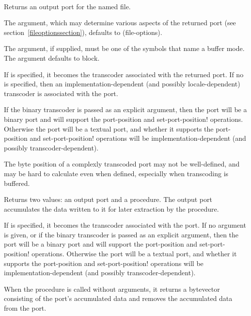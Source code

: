 \begin{entry}{%
\\
}

Returns an output port for the named file.

The  argument, which may determine
various aspects of the returned port (see section~\ref{fileoptionssection}),
defaults to {\cf (file-options)}.

The  argument, if supplied,
must be one of the symbols that name a buffer mode.
The  argument defaults to {\cf block}.

If  is specified, it becomes the transcoder associated
with the returned port.
If no  is specified, then an implementation-dependent
(and possibly locale-dependent) transcoder is associated with the port.

If the binary transcoder is passed as an explicit argument,
then the port will be a binary port and will support the
{\cf port-position} and {\cf set-port-position!}  operations.
Otherwise the port will be a textual port, and whether it supports
the {\cf port-position} and {\cf set-port-position!} operations
will be implementation-dependent (and possibly transcoder-dependent).

\begin{rationale}
  The byte position of a complexly transcoded port may not be
  well-defined, and may be hard to calculate even when defined,
  especially when transcoding is buffered.
\end{rationale}
\end{entry}   

\begin{entry}{%
}

Returns two values: an output port and a procedure.
The output port accumulates the data written to it for
later extraction by the procedure.

If  is specified, it becomes
the transcoder associated with the port.
If no  argument is given, or
if the binary transcoder is passed as an explicit argument,
then the port will be a binary port and will support the
{\cf port-position} and {\cf set-port-position!}  operations.
Otherwise the port will be a textual port, and whether it supports
the {\cf port-position} and {\cf set-port-position!} operations
will be implementation-dependent (and possibly transcoder-dependent).

When the procedure is called without arguments, it returns a bytevector consisting of the
port's accumulated data and removes the accumulated data from the port.
\end{entry}

